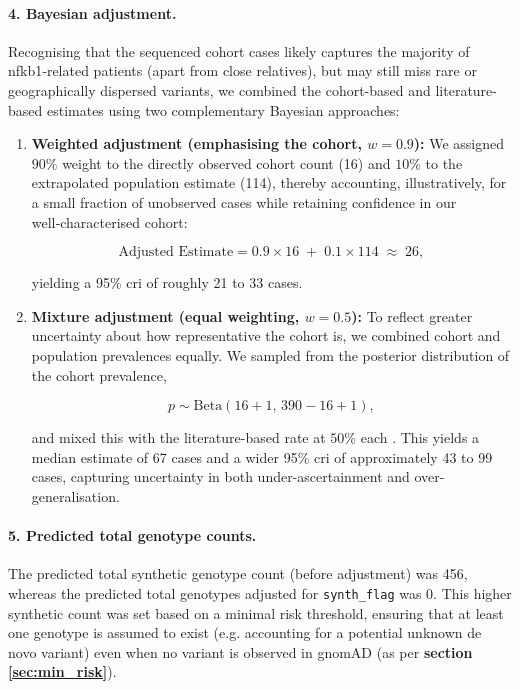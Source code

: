 \paragraph{4. Bayesian adjustment.}
Recognising that the sequenced cohort cases likely captures the majority of \ac{nfkb1}‑related patients (apart from close relatives), but may still miss rare or geographically dispersed variants, we combined the cohort-based and literature-based estimates using two complementary Bayesian approaches:

\begin{enumerate}
  \item \textbf{Weighted adjustment (emphasising the cohort, \(w=0.9\)):}  
  We assigned \(90\%\) weight to the directly observed cohort count (16) and \(10\%\) to the extrapolated population estimate (114), thereby accounting, illustratively, for a small fraction of unobserved cases while retaining confidence in our well‑characterised cohort:

  \[
    \text{Adjusted Estimate}
    = 0.9 \times 16 \;+\; 0.1 \times 114
    \;\approx\; 26,
  \]
  
  yielding a 95\% \ac{cri} of roughly 21 to 33 cases.
  
  \item \textbf{Mixture adjustment (equal weighting, \(w=0.5\)):}  
  To reflect greater uncertainty about how representative the cohort is, we combined cohort and population prevalences equally. 
  We sampled from the posterior distribution of the cohort prevalence,
 
  \[
    p \sim \mathrm{Beta}(16 + 1,\,390 - 16 + 1),
  \]

  and mixed this with the literature-based rate at \(50\%\) each \cite{tuijnenburgNFKB12018, who1997primary, oksenhendler2008infections}. 
  This yields a median estimate of 67 cases and a wider 95\% \ac{cri} of approximately 43 to 99 cases, capturing uncertainty in both under-ascertainment and over-generalisation.
\end{enumerate}

\paragraph{5. Predicted total genotype counts.}
The predicted total synthetic genotype count (before adjustment) was 456, whereas the predicted total genotypes adjusted for \texttt{synth\_flag} was 0. 
This higher synthetic count was set based on a minimal risk threshold, ensuring that at least one genotype is assumed to exist (e.g. accounting for a potential unknown de novo variant) even when no variant is observed in gnomAD (as per \textbf{section
\ref{sec:min_risk}}).

